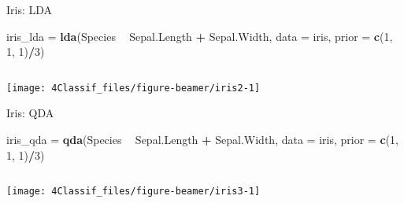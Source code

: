 \documentclass[10pt,ignorenonframetext,]{beamer}
\newenvironment{Shaded}{\begin{snugshade}}{\end{snugshade}}
\newcommand{\DataTypeTok}[1]{\textcolor[rgb]{0.13,0.29,0.53}{#1}}
\newcommand{\DecValTok}[1]{\textcolor[rgb]{0.00,0.00,0.81}{#1}}
\newcommand{\KeywordTok}[1]{\textcolor[rgb]{0.13,0.29,0.53}{\textbf{#1}}}
\newcommand{\NormalTok}[1]{#1}
\newcommand{\OperatorTok}[1]{\textcolor[rgb]{0.81,0.36,0.00}{\textbf{#1}}}
\newcommand{\StringTok}[1]{\textcolor[rgb]{0.31,0.60,0.02}{#1}}
\begin{document}
\begin{frame}[fragile]

\begin{block}{Iris: LDA}

\scriptsize

\begin{Shaded}
\begin{Highlighting}[]
\NormalTok{iris_lda =}\StringTok{ }\KeywordTok{lda}\NormalTok{(Species }\OperatorTok{~}\StringTok{ }\NormalTok{Sepal.Length }\OperatorTok{+}\StringTok{ }\NormalTok{Sepal.Width, }\DataTypeTok{data =}\NormalTok{ iris, }\DataTypeTok{prior =} \KeywordTok{c}\NormalTok{(}\DecValTok{1}\NormalTok{, }
    \DecValTok{1}\NormalTok{, }\DecValTok{1}\NormalTok{)}\OperatorTok{/}\DecValTok{3}\NormalTok{)}
\end{Highlighting}
\end{Shaded}

\(~\)

\begin{center}\texttt{[image: 4Classif\_files/figure-beamer/iris2-1]} \end{center}

\end{block}

\end{frame}

\begin{frame}[fragile]

\begin{block}{Iris: QDA}

\scriptsize

\begin{Shaded}
\begin{Highlighting}[]
\NormalTok{iris_qda =}\StringTok{ }\KeywordTok{qda}\NormalTok{(Species }\OperatorTok{~}\StringTok{ }\NormalTok{Sepal.Length }\OperatorTok{+}\StringTok{ }\NormalTok{Sepal.Width, }\DataTypeTok{data =}\NormalTok{ iris, }\DataTypeTok{prior =} \KeywordTok{c}\NormalTok{(}\DecValTok{1}\NormalTok{, }
    \DecValTok{1}\NormalTok{, }\DecValTok{1}\NormalTok{)}\OperatorTok{/}\DecValTok{3}\NormalTok{)}
\end{Highlighting}
\end{Shaded}

\(~\)

\begin{center}\texttt{[image: 4Classif\_files/figure-beamer/iris3-1]} \end{center}

\end{block}

\end{frame}
\end{document}
